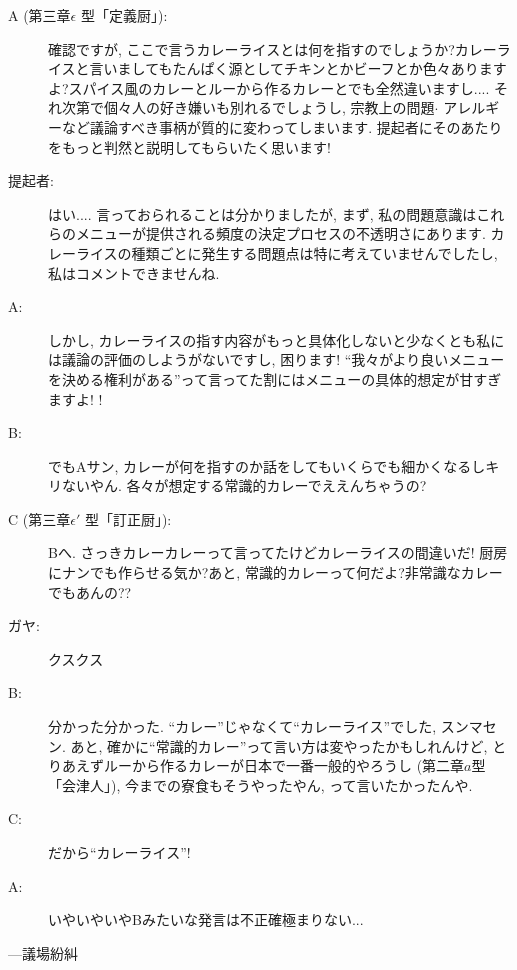 \documentclass[10pt,b5jsbook,dvips,dvipdfmx,openany]{jsbook}
\theoremstyle{definition}
\begin{document}
\begin{description}
		\item[A (第三章$ \epsilon $ 型「定義厨」): ]確認ですが, ここで言うカレーライスとは何を指すのでしょうか?カレーライスと言いましてもたんぱく源としてチキンとかビーフとか色々ありますよ?スパイス風のカレーとルーから作るカレーとでも全然違いますし.... それ次第で個々人の好き嫌いも別れるでしょうし, 宗教上の問題$ \cdot $ アレルギーなど議論すべき事柄が質的に変わってしまいます. 提起者にそのあたりをもっと判然と説明してもらいたく思います!

		\item[提起者: ]はい.... 言っておられることは分かりましたが, まず, 私の問題意識はこれらのメニューが提供される頻度の決定プロセスの不透明さにあります. カレーライスの種類ごとに発生する問題点は特に考えていませんでしたし, 私はコメントできませんね.

		\item[A: ]しかし, カレーライスの指す内容がもっと具体化しないと少なくとも私には議論の評価のしようがないですし, 困ります! ``我々がより良いメニューを決める権利がある''って言ってた割にはメニューの具体的想定が甘すぎますよ! !

		\item[B: ]でもAサン, カレーが何を指すのか話をしてもいくらでも細かくなるしキリないやん. 各々が想定する常識的カレーでええんちゃうの?

		\item[C (第三章$ \epsilon ' $  型「訂正厨」): ] Bへ. さっきカレーカレーって言ってたけどカレーライスの間違いだ! 厨房にナンでも作らせる気か?あと, 常識的カレーって何だよ?非常識なカレーでもあんの??

		\item[ガヤ: ] クスクス

		\item[B: ] 分かった分かった. ``カレー''じゃなくて``カレーライス''でした, スンマセン. あと, 確かに``常識的カレー''って言い方は変やったかもしれんけど, とりあえずルーから作るカレーが日本で一番一般的やろうし (第二章$a$型「会津人」), 今までの寮食もそうやったやん, って言いたかったんや.

		\item[C: ]だから``カレーライス''!
		\item[A: ]いやいやいやBみたいな発言は不正確極まりない...

		\end{description}

		---議場紛糾
\end{document}
